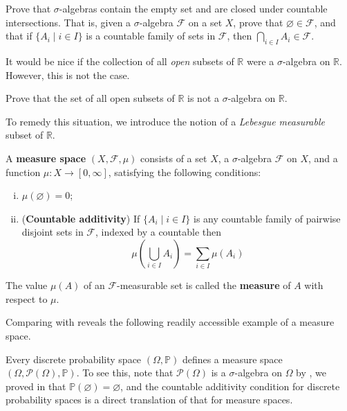 \begin{exercise}
Prove that $\sigma$-algebras contain the empty set and are closed under countable intersections. That is, given a $\sigma$-algebra $\mathcal{F}$ on a set $X$, prove that $\varnothing \in \mathcal{F}$, and that if $\{ A_i \mid i \in I \}$ is a countable family of sets in $\mathcal{F}$, then $\bigcap_{i \in I} A_i \in \mathcal{F}$.
\end{exercise}

It would be nice if the collection of all \textit{open} subsets of $\mathbb{R}$ were a $\sigma$-algebra on $\mathbb{R}$. However, this is not the case.

\begin{exercise}
Prove that the set of all open subsets of $\mathbb{R}$ is not a $\sigma$-algebra on $\mathbb{R}$.
\end{exercise}

To remedy this situation, we introduce the notion of a \textit{Lebesgue measurable} subset of $\mathbb{R}$.



\todo{}

\begin{definition}
\label{defMeasureSpace}
A \textbf{measure space} $(X, \mathcal{F}, \mu)$ consists of a set $X$, a $\sigma$-algebra $\mathcal{F}$ on $X$, and a function $\mu : X \to [0,\infty]$, satisfying the following conditions:
\begin{enumerate}[(i)]
\item $\mu(\varnothing) = 0$;
\item (\textbf{Countable additivity}) If $\{ A_i \mid i \in I \}$ is any countable family of pairwise disjoint sets in $\mathcal{F}$, indexed by a countable then
\[ \mu \left( \bigcup_{i \in I} A_i \right) = \sum_{i \in I} \mu(A_i) \]
\end{enumerate}
The value $\mu(A)$ of an $\mathcal{F}$-measurable set is called the \textbf{measure} of $A$ with respect to $\mu$.
\end{definition}

Comparing with  reveals the following readily accessible example of a measure space.

\begin{example}
Every discrete probability space $(\Omega, \mathbb{P})$ defines a measure space $(\Omega, \mathcal{P}(\Omega), \mathbb{P})$. To see this, note that $\mathcal{P}(\Omega)$ is a $\sigma$-algebra on $\Omega$ by , we proved in  that $\mathbb{P}(\varnothing) = \varnothing$, and the countable additivity condition for discrete probability spaces is a direct translation of that for measure spaces.
\end{example}

